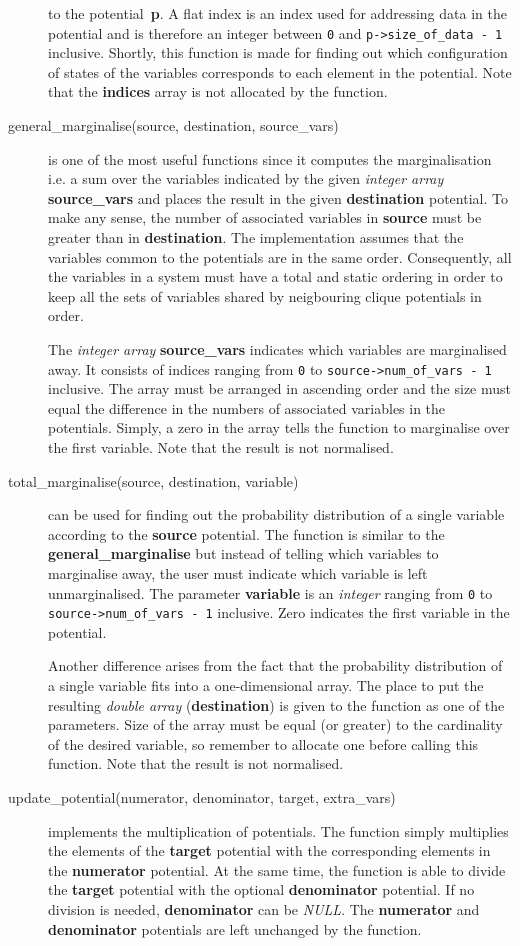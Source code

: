 \documentclass[12pt,a4paper]{report}
\begin{document}
\begin{description}
to the potential~\textbf{p}. A flat index is an index used for addressing
data in the potential and is therefore an integer between \verb+0+ and 
\verb+p->size_of_data - 1+ inclusive. Shortly, this function is made for
finding out which configuration of states of the variables corresponds
to each element in the potential. Note that the \textbf{indices} array 
is not allocated by the function.
\item[general\_marginalise(source, destination, source\_vars)] is one
of the most useful functions since it computes the marginalisation
i.e. a sum over the variables indicated by the given {\it integer
array} \textbf{source\_vars} and places the result in the given
\textbf{destination} potential. To make any sense, the number of
associated variables in \textbf{source} must be greater than in
\textbf{destination}. The implementation assumes that the variables 
common to the potentials are in the same order. Consequently, all the 
variables in a system must have a total and static ordering in
order to keep all the sets of variables shared by neigbouring clique
potentials in order.

The {\it integer array} \textbf{source\_vars} indicates which
variables are marginalised away. It consists of indices ranging from
\verb+0+ to \verb+source->num_of_vars - 1+ inclusive. The array
must be arranged in ascending order and the size must equal the
difference in the numbers of associated variables in the potentials. 
Simply, a zero in the array tells the function to marginalise over the 
first variable. Note that the result is not normalised.
\item[total\_marginalise(source, destination, variable)] can be used
for finding out the probability distribution of a single variable
according to the \textbf{source} potential. The function is similar to
the \textbf{general\_marginalise} but instead of telling which
variables to marginalise away, the user must indicate which
variable is left unmarginalised. The parameter \textbf{variable} is 
an {\it integer} ranging from \verb+0+ to\\
\verb+source->num_of_vars - 1+ inclusive. Zero indicates the first
variable in the potential.

Another difference arises from the fact that the probability 
distribution of a single variable fits into a one-dimensional array. 
The place to put the resulting {\it double array} 
(\textbf{destination}) is given to the function as one of the
parameters. Size of the array must be equal (or greater) to the
cardinality of the desired variable, so remember to allocate one
before calling this function. Note that the result is not normalised.
\item[update\_potential(numerator, denominator, target, extra\_vars)] 
implements the multiplication of potentials. The function simply
multiplies the elements of the \textbf{target} potential with the
corresponding elements in the \textbf{numerator} potential. At the
same time, the function is able to divide the \textbf{target}
potential with the optional \textbf{denominator} potential. If no
division is needed, \textbf{denominator} can be {\it NULL}.
The \textbf{numerator} and \textbf{denominator} potentials are left
unchanged by the function.


\end{description}
\end{document}
